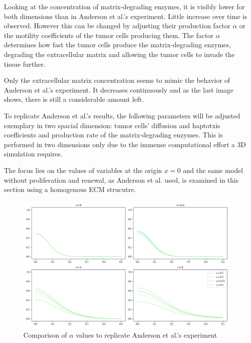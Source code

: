 Looking at the concentration of matrix-degrading enzymes, it is visibly lower for both dimensions than in Anderson et al.'s experiment. Little increase over time is observed. However this can be changed by adjusting their production factor $\alpha$ or the motility coefficients of the tumor cells producing them. The factor $\alpha$ determines how fast the tumor cells produce the matrix-degrading enzymes, degrading the extracellular matrix and allowing the tumor cells to invade the tissue further.

Only the extracellular matrix concentration seems to mimic the behavior of Anderson et al.'s experiment. It decreases continuously and as the last image shows, there is still a considerable amount left.

To replicate Anderson et al.'s results, the following parameters will be adjusted exemplary in two spacial dimension: tumor cells' diffusion and haptotxis coefficients and production rate of the matrix-degrading enzymes. This is performed in two dimensions only due to the immense computational effort a 3D simulation requires.

The focus lies on the values of variables at the origin $x=0$ and the same model without proliferation and renewal, as Anderson et al. used, is examined in this section using a homogenous ECM strucutre.

\begin{figure}[!htb]
 \centering
 \includegraphics[width=\textwidth]{resources/images/alpha_comparison.png}
 \caption{Comparison of $\alpha$ values to replicate Anderson et al.'s experiment}
 \label{fig:replication_alpha_comparison}
\end{figure}

